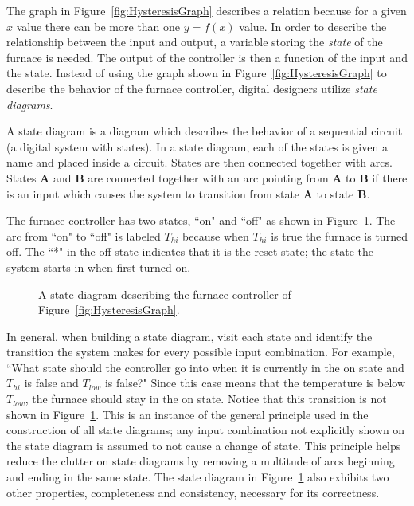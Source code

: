 The graph in Figure~\ref{fig:HysteresisGraph} describes a relation because 
for a given $x$ value there can be more than one $y=f(x)$ value.  In order to
describe the relationship between the input and output, a variable 
storing the {\it state} of the furnace is needed.  The output of the controller 
is then a function of the input and the state.  Instead of using the graph
shown in Figure~\ref{fig:HysteresisGraph} to describe the behavior of the
furnace controller, digital designers utilize {\it state diagrams}.

A state diagram is a diagram which describes the behavior of a sequential
circuit (a digital system with states).  In a state diagram, each of the
states is given a name and placed inside a circuit.  States are then 
connected together with arcs. States {\bf A} and {\bf B} are connected together 
with an arc pointing from {\bf A} to {\bf B} if there is an input which causes 
the system to transition from state {\bf A} to state {\bf B}.  

The furnace controller has two states, ``on" and ``off" as shown in
Figure~\ref{fig:HysteresisSD}.  The arc from ``on" to ``off" is labeled
$T_{hi}$ because when $T_{hi}$ is true the furnace is turned off.  
The ``*" in the off state indicates that it is the reset state; the 
state the system starts in when first turned on.

\begin{figure}[ht]
\caption{A state diagram describing the furnace controller of
Figure~\ref{fig:HysteresisGraph}.}
\label{fig:HysteresisSD}
\end{figure}

In general, when building a state diagram, visit each state
and identify the transition the system makes for every possible 
input combination.  For example, ``What state should the controller go into 
when it is currently in the on state and $T_{hi}$ is false and $T_{low}$ is 
false?" Since this case means that the temperature is below $T_{low}$, 
the furnace should stay in the on state.  Notice that this 
transition is not shown in Figure~\ref{fig:HysteresisSD}.  This is an 
instance of the general principle used in the construction of all state 
diagrams; any input combination not explicitly shown on the state diagram 
is assumed to not cause a change of state. This principle helps reduce the 
clutter on state diagrams by removing a multitude of arcs beginning and ending
in the same state.  The state diagram in Figure~\ref{fig:HysteresisSD} also
exhibits two other properties, completeness and consistency, necessary
for its correctness.

